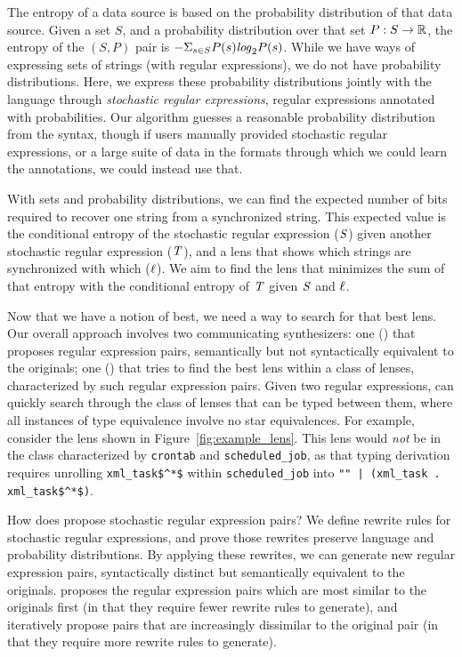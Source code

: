 \documentclass[acmsmall,screen,anonymous]{acmart}
\begin{document}
The entropy of a data source is based on the probability distribution of that
data source. Given a set $S$, and a probability distribution over that set $P
: S \rightarrow \mathbb{R}$, the entropy of the $(S,P)$ pair is $-\Sigma_{s\in
  S}P(s)\mathit{log}_2P(s)$. While we have ways of expressing sets of strings (with
regular expressions), we do not have probability distributions. Here, we
express these probability distributions jointly with the language through
\emph{stochastic regular expressions}, regular expressions annotated with
probabilities. Our algorithm guesses a reasonable probability distribution from
the syntax, though if users manually provided stochastic regular expressions, or
a large suite of data in the formats through which we could learn the annotations,
we could instead use that.

With sets and probability distributions, we can find the expected number of bits
required to recover one string from a synchronized string. This expected value
is the conditional entropy of the stochastic regular expression ($\mathit{S}$) given
another stochastic regular expression ($\mathit{T}$), and a lens that shows which
strings are synchronized with which ($\mathit{\ell}$). We aim to find the lens that
minimizes the sum of that entropy with the conditional entropy of $\mathit{T}$
given $\mathit{S}$ and $\mathit{\ell}$. 

Now that we have a notion of best, we need a way to
search for that best lens.
Our overall approach involves two communicating synthesizers: one (\RXSearch)
that proposes regular expression pairs, semantically but not syntactically
equivalent to the originals; one (\GreedySynth) that tries to find the best lens
within a class of lenses, characterized by such regular expression pairs. Given
two regular expressions, \GreedySynth can quickly search through the class of
lenses that can be typed between them, where all instances of type equivalence
involve no star equivalences. For example, consider the lens shown in
Figure~\ref{fig:example_lens}. This lens would \emph{not} be in the class
characterized by \lstinline{crontab} and \lstinline{scheduled_job}, as that
typing derivation requires unrolling \lstinline{xml_task$^*$} within
\lstinline{scheduled_job} into \lstinline{"" | (xml_task . xml_task$^*$)}.

How does \RXSearch propose stochastic regular expression pairs? We define
rewrite rules for stochastic regular expressions, and prove those rewrites
preserve language and probability distributions. By applying these rewrites, we
can generate new regular expression pairs, syntactically distinct but
semantically equivalent to the originals. \RXSearch proposes the regular
expression pairs which are most similar to the originals first (in that they
require fewer rewrite rules to generate), and iteratively propose pairs that are
increasingly dissimilar to the original pair (in that they require more rewrite
rules to generate).
\end{document}
